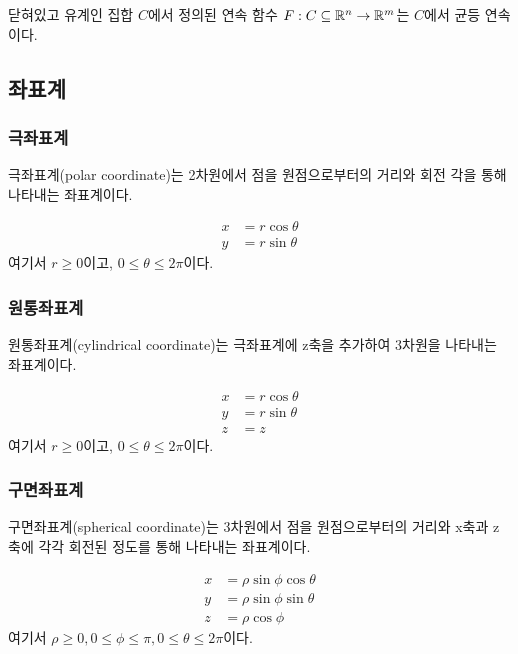 \begin{theorem}
닫혀있고 유계인 집합 $C$에서 정의된 연속 함수 $F : C \subseteq \mathbb{R}^n \to \mathbb{R}^m$는 $C$에서 균등 연속이다.
\end{theorem}

\subsection{좌표계}
\subsubsection{극좌표계}
극좌표계(polar coordinate)는 2차원에서 점을 원점으로부터의 거리와 회전 각을 통해 나타내는 좌표계이다.
\begin{definition}[극좌표계]
\begin{align*}
x &= r \cos \theta\\
y &= r \sin \theta
\end{align*}
여기서 $r \geq 0$이고, $0 \leq \theta \leq 2 \pi$이다.
\end{definition}

\subsubsection{원통좌표계}
원통좌표계(cylindrical coordinate)는 극좌표계에 z축을 추가하여 3차원을 나타내는 좌표계이다.
\begin{definition}[원통좌표계]
\begin{align*}
x &= r \cos \theta\\
y &= r \sin \theta\\
z &= z
\end{align*}
여기서 $r \geq 0$이고, $0 \leq \theta \leq 2 \pi$이다.
\end{definition}

\subsubsection{구면좌표계}
구면좌표계(spherical coordinate)는 3차원에서 점을 원점으로부터의 거리와 x축과 z축에 각각 회전된 정도를 통해 나타내는 좌표계이다.
\begin{definition}[구면좌표계]
\begin{align*}
x &= \rho \sin \phi \cos \theta\\
y &= \rho \sin \phi \sin \theta\\
z &= \rho \cos \phi
\end{align*}
여기서 $\rho \geq 0, 0 \leq \phi \leq \pi, 0 \leq \theta \leq 2 \pi$이다.
\end{definition}
